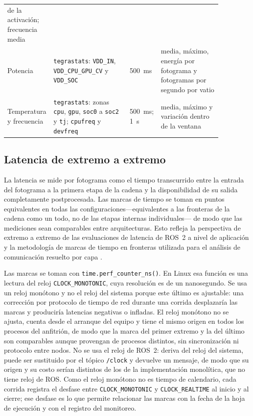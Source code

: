 \begin{table}[htbp]
\begin{tabular}{@{}L{0.13\linewidth}L{0.35\linewidth}L{0.11\linewidth}L{0.28\linewidth}@{}}
      de la activación; frecuencia media \\
    Potencia & \texttt{tegrastats}: \texttt{VDD\_IN},
      \texttt{VDD\_CPU\_GPU\_CV} y \texttt{VDD\_SOC} & 500~ms & media,
      máximo, energía por fotograma y fotogramas por segundo por vatio \\
    Temperatura y frecuencia & \texttt{tegrastats}: zonas \texttt{cpu},
      \texttt{gpu}, \texttt{soc0} a \texttt{soc2} y \texttt{tj};
      \texttt{cpufreq} y \texttt{devfreq} & 500~ms; 1~s & media, máximo y
      variación dentro de la ventana \\
    \bottomrule
  \end{tabular}
\end{table}

\subsection{Latencia de extremo a extremo}
\label{sec:latency}

La latencia se mide por fotograma como el tiempo transcurrido entre la
entrada del fotograma a la primera etapa de la cadena y la disponibilidad de
su salida completamente postprocesada. Las marcas de tiempo se toman en
puntos equivalentes en todas las configuraciones---equivalentes a las
fronteras de la cadena como un todo, no de las etapas internas
individuales--- de modo que las mediciones sean comparables entre
arquitecturas. Esto refleja la perspectiva de extremo a extremo de las
evaluaciones de latencia de ROS~2 a nivel de aplicación \cite{betz2023a} y
la metodología de marcas de tiempo en fronteras utilizada para el análisis
de comunicación resuelto por capa \cite{kamiya2025}.

Las marcas se toman con \texttt{time.perf\_counter\_ns()}. En Linux esa
función es una lectura del reloj \texttt{CLOCK\_MONOTONIC}, cuya resolución es
de un nanosegundo.
Se usa un reloj monótono y no el reloj del sistema porque este último es
ajustable: una corrección por protocolo de tiempo de red durante una corrida
desplazaría las marcas y produciría latencias negativas o infladas. El reloj
monótono no se ajusta, cuenta desde el arranque del equipo y tiene el mismo
origen en todos los procesos del anfitrión, de modo que la marca del primer
extremo y la del último son comparables aunque provengan de procesos
distintos, sin sincronización ni protocolo entre nodos. No se usa el reloj de
ROS~2: deriva del reloj del sistema, puede ser sustituido por el tópico
\texttt{/clock} y devuelve un mensaje, de modo que su origen y su costo
serían distintos de los de la implementación monolítica, que no tiene reloj
de ROS. Como el reloj monótono no es tiempo de calendario, cada corrida
registra el desfase entre \texttt{CLOCK\_MONOTONIC} y
\texttt{CLOCK\_REALTIME} al inicio y al cierre; ese desfase es lo que permite
relacionar las marcas con la fecha de la hoja de ejecución y con el registro
del monitoreo.

